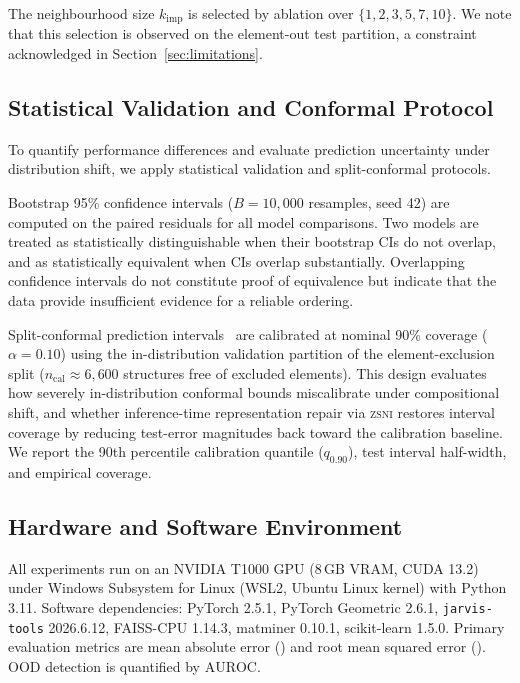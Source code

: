 \documentclass[final,5p,twocolumn,10pt]{elsarticle}
\newcommand{\mae}{\text{MAE}}
\newcommand{\rmse}{\text{RMSE}}
\newcommand{\auroc}{\text{AUROC}}
\newcommand{\zsni}{\textsc{zsni}}
\begin{document}
The neighbourhood size $k_{\text{imp}}$ is selected by ablation over
$\{1, 2, 3, 5, 7, 10\}$. We note that this selection is observed on the
element-out test partition, a constraint acknowledged in
Section~\ref{sec:limitations}.

\subsection{Statistical Validation and Conformal Protocol}
\label{sec:stats}

To quantify performance differences and evaluate prediction uncertainty under
distribution shift, we apply statistical validation and split-conformal protocols.

Bootstrap 95\% confidence intervals ($B = 10{,}000$ resamples, seed 42) are
computed on the paired residuals for all model comparisons. Two models
are treated as statistically distinguishable when their bootstrap CIs do not
overlap, and as statistically equivalent when CIs overlap substantially.
Overlapping confidence intervals do not constitute proof of equivalence but
indicate that the data provide insufficient evidence for a reliable ordering.

Split-conformal prediction intervals~\cite{papadopoulos2002inductive}
are calibrated at nominal 90\% coverage ($\alpha = 0.10$) using the
in-distribution validation partition of the element-exclusion split
($n_{\text{cal}} \approx 6{,}600$ structures free of excluded elements).
This design evaluates how severely in-distribution conformal bounds miscalibrate under
compositional shift, and whether inference-time representation repair via
\zsni{} restores interval coverage by reducing test-error magnitudes back
toward the calibration baseline. We report the 90th percentile calibration
quantile ($q_{0.90}$), test interval half-width, and empirical coverage.

\subsection{Hardware and Software Environment}
\label{sec:setup}

All experiments run on an NVIDIA T1000 GPU (8\,GB VRAM, CUDA 13.2)
under Windows Subsystem for Linux (WSL2, Ubuntu Linux kernel) with Python 3.11.
Software dependencies: PyTorch 2.5.1, PyTorch Geometric 2.6.1,
\texttt{jarvis-tools} 2026.6.12, FAISS-CPU 1.14.3, matminer 0.10.1,
scikit-learn 1.5.0. Primary evaluation metrics are mean absolute error
(\mae{}) and root mean squared error (\rmse{}). OOD detection is quantified
by $\auroc{}$.
\end{document}

